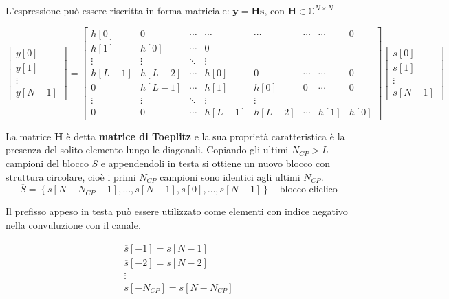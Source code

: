 L'espressione può essere riscritta in forma matriciale: $\mathbf{y} = \mathbf{H} \mathbf{s}$, con $\mathbf{H} \in \mathbb{C}^{N \times N}$ 

\[ 
\begin{bmatrix} y[0] \\ y[1] \\ \vdots \\ y[N-1] \end{bmatrix} 
= 
\begin{bmatrix}
    h[0] & 0 & \cdots & \cdots & \cdots & \cdots & \cdots & 0 \\
    h[1] & h[0] & \cdots & 0 \\
    \vdots & \vdots & \ddots & \vdots \\
    h[L-1] & h[L-2] & \cdots & h[0] & 0 & \cdots & \cdots & 0 \\
    0 & h[L-1] & \cdots & h[1] & h[0] & 0 & \cdots & 0 \\
    \vdots & \vdots & \ddots & \vdots & \vdots \\
    0 & 0 & \cdots & h[L-1] & h[L-2] & \cdots & h[1] & h[0]
\end{bmatrix}   
\begin{bmatrix} s[0] \\ s[1] \\ \vdots \\ s[N-1] \end{bmatrix}
\]

La matrice $\mathbf{H}$ è detta \textbf{matrice di Toeplitz} e la sua proprietà caratteristica è la presenza del solito elemento lungo le diagonali. Copiando gli ultimi $N_{CP} > L$ campioni del blocco $S$ e appendendoli in testa si ottiene un nuovo blocco con struttura circolare, cioè i primi $N_{CP}$ campioni sono identici agli ultimi $N_{CP}$.
\[
    \overline{S} = \left\{s\left[N - N_{CP} - 1\right], \ldots, s\left[N - 1\right], s\left[0\right], \ldots, s\left[N - 1\right]\right\} \quad \text{blocco cliclico}
\]


Il prefisso appeso in testa può essere utilizzato come elementi con indice negativo nella convuluzione con il canale.



\[
    \begin{array}{ll}
        \overline{s}[-1] = s[N - 1] \\
        \overline{s}[-2] = s[N - 2] \\
        \vdots \\
        \overline{s}[-N_{CP}] = s[N - N_{CP}]
    \end{array}
\]



